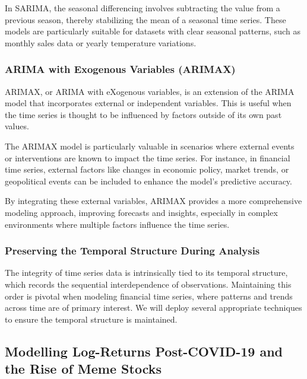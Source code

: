 \documentclass[12pt, twoside,hidelinks]{article}
\theoremstyle{definition}
\numberwithin{equation}{section}
\begin{document}
In SARIMA, the seasonal differencing involves subtracting the value from a previous season, thereby stabilizing the mean of a seasonal time series. These models are particularly suitable for datasets with clear seasonal patterns, such as monthly sales data or yearly temperature variations.

\subsubsection*{ARIMA with Exogenous Variables (ARIMAX)}

ARIMAX, or ARIMA with eXogenous variables, is an extension of the ARIMA model that incorporates external or independent variables. This is useful when the time series is thought to be influenced by factors outside of its own past values. 
\newline

The ARIMAX model is particularly valuable in scenarios where external events or interventions are known to impact the time series. For instance, in financial time series, external factors like changes in economic policy, market trends, or geopolitical events can be included to enhance the model's predictive accuracy.
\newline

By integrating these external variables, ARIMAX provides a more comprehensive modeling approach, improving forecasts and insights, especially in complex environments where multiple factors influence the time series.



\subsubsection*{Preserving the Temporal Structure During Analysis}
The integrity of time series data is intrinsically tied to its temporal structure, which records the sequential interdependence of observations. Maintaining this order is pivotal when modeling financial time series, where patterns and trends across time are of primary interest. We will deploy several appropriate techniques to ensure the temporal structure is maintained.


\subsection{Modelling Log-Returns Post-COVID-19 and the Rise of Meme Stocks}
\end{document}
